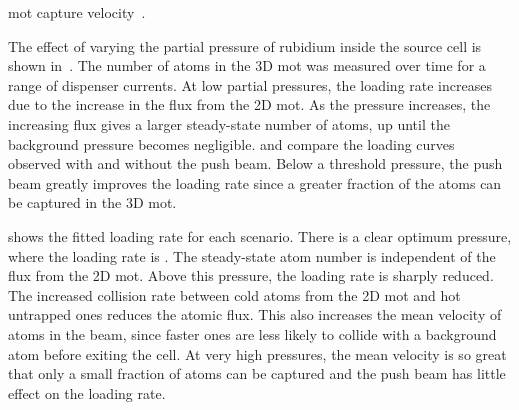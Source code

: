 \ac{mot} capture velocity~\cite{Schoser2002}. \par\noindent The effect of
varying the partial pressure of rubidium inside the source cell is shown
in~. The number of atoms in the 3D \ac{mot} was measured over time for a range of dispenser currents. At low partial pressures,
the loading rate increases due to the increase in the flux from the 2D \ac{mot}.
As the pressure increases, the increasing flux gives a larger steady-state
number of atoms, up until the background pressure becomes negligible.
 and  compare the loading
curves observed with and without the push beam. Below a threshold pressure, the
push beam greatly improves the loading rate since a greater fraction of the
atoms can be captured in the 3D \ac{mot}. 
\par\noindent {} shows the
fitted loading rate for each scenario. There is a clear optimum pressure,
where the loading rate is . The steady-state atom number is
independent of the flux from the 2D \ac{mot}. Above this pressure, the loading rate is
sharply reduced. The increased collision rate between cold atoms from the 2D
\ac{mot} and hot untrapped ones reduces the atomic flux. This also increases the
mean velocity of atoms in the beam, since faster ones are less likely to collide
with a background atom before exiting the cell. At very high pressures, the mean
velocity is so great that only a small fraction of atoms can be captured and the
push beam has little effect on the loading rate.
